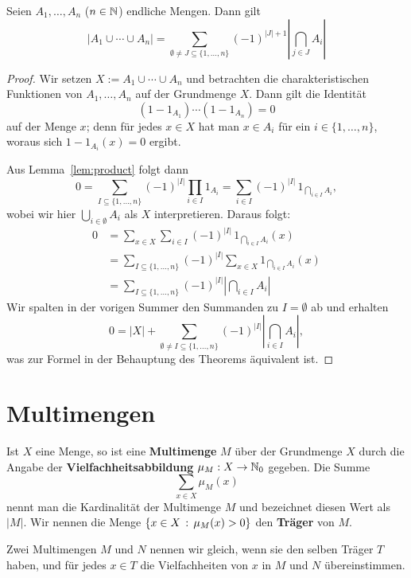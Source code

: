 \begin{thm}
	Seien $A_1,\ldots,A_n$ ($n \in \mathbb{N}$) endliche Mengen. Dann gilt 
	\[
		| A_1 \cup \cdots \cup A_n| = \sum_{\emptyset \ne J \subseteq \{1,\ldots,n\}} (-1)^{|J|+1} \left| \bigcap_{j \in J} A_i \right| 
	\]
\end{thm} 
\begin{proof} 
	Wir setzen $X := A_1 \cup \cdots \cup A_n$ und betrachten die charakteristischen Funktionen von $A_1,\ldots,A_n$ auf der Grundmenge $X$. Dann gilt die Identität
	\[
		  (1-1_{A_1} )  \cdots (1 -1_{A_n}) = 0
	\]
	auf der Menge $x$; denn für jedes $x \in X$ hat man $x \in A_i$ für ein $i \in \{1,\ldots,n\}$, woraus sich $1 - 1_{A_i}(x) = 0$ ergibt. 
	
	Aus Lemma~\ref{lem:product} folgt dann 
	\[
		 0 = \sum_{I \subseteq \{1,\ldots,n\}} (-1)^{|I|} \prod_{i \in I} 1_{A_i} = \sum_{i \in I} (-1)^{|I| } \, 1_{\bigcap_{i \in I} A_i},
	\]
	wobei wir hier $\bigcup_{i \in \emptyset} A_i$ als $X$ interpretieren. 
	Daraus folgt: 
	\begin{align*}
		0  & = \sum_{x \in X} \sum_{i \in I} (-1)^{|I| } \, 1_{\bigcap_{i \in I} A_i}(x)
		\\ & = \sum_{I \subseteq \{1,\ldots,n\} } (-1)^{|I| } \sum_{x \in X} 1_{\bigcap_{i \in I} A_i}(x)
		\\ & = \sum_{I \subseteq \{1,\ldots,n\}} (-1)^{|I| } \left| \bigcap_{i \in I} A_i \right|
	\end{align*}
	Wir spalten in der vorigen Summer den Summanden zu $I = \emptyset$ ab und erhalten 
	\[
		0  = |X| + \sum_{\emptyset \ne I \subseteq \{1,\ldots,n\}} (-1)^{|I| } \left| \bigcap_{i \in I} A_i \right|,
	\]
	was zur Formel in der Behauptung des Theorems äquivalent ist. 
\end{proof} 

\section{Multimengen} 

\begin{defn}
Ist $X$ eine Menge, so ist eine \textbf{Multimenge} $M$ über der Grundmenge $X$ durch die Angabe der \textbf{Vielfachheitsabbildung} $\mu_M : X \to \mathbb{N}_0$ gegeben. Die Summe
\[
	\sum_{x \in X} \mu_M(x)
\]
nennt man die Kardinalität der Multimenge $M$ und bezeichnet diesen Wert als $|M|$.  Wir nennen die Menge $\left\{  x \in X \,:\, \mu_M(x)>0 \right\}$ den \textbf{Träger} von $M$.

Zwei Multimengen $M$ und $N$ nennen wir gleich, wenn sie den selben Träger $T$ haben, und für jedes $x \in T$ die Vielfachheiten von $x$ in $M$ und $N$ übereinstimmen.
\end{defn} 

